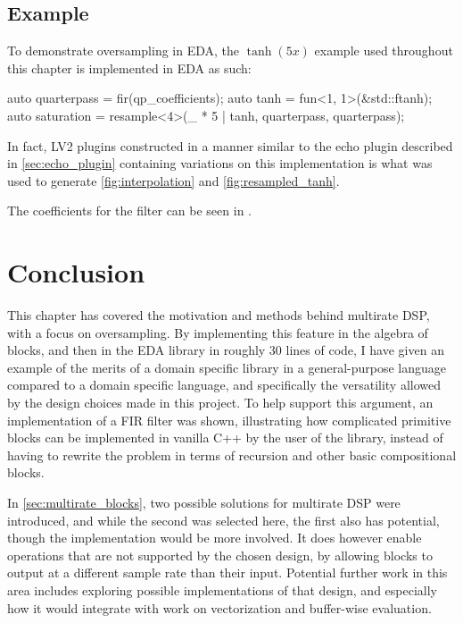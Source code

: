 \subsection{Example}

To demonstrate oversampling in EDA, the $\tanh(5x)$ example used throughout this chapter is
implemented in EDA as such:

\begin{cppcodenl}
  auto quarterpass = fir(qp_coefficients);
  auto tanh = fun<1, 1>(&std::ftanh);
  auto saturation = resample<4>(_ * 5 | tanh, quarterpass, quarterpass);
\end{cppcodenl}

In fact, LV2 plugins constructed in a manner similar to the echo plugin described in \autoref{sec:echo_plugin}
containing variations on this implementation is what was used to generate \autoref{fig:interpolation} and
\autoref{fig:resampled_tanh}.

The coefficients for the filter can be seen in .

\section{Conclusion}

This chapter has covered the motivation and methods behind multirate DSP, with a focus on oversampling. By
implementing this feature in the algebra of blocks, and then in the EDA library in roughly 30 lines of code,
I have given an example of the merits of a domain specific library in a general-purpose language compared to
a domain specific language, and specifically the versatility allowed by the design choices made in this
project. To help support this argument, an implementation of a FIR filter was shown, illustrating how
complicated primitive blocks can be implemented in vanilla C++ by the user of the library, instead of having
to rewrite the problem in terms of recursion and other basic compositional blocks.

In \autoref{sec:multirate_blocks}, two possible solutions for multirate DSP were introduced, and while the second
was selected here, the first also has potential, though the implementation would be more involved. It does
however enable operations that are not supported by the chosen design, by allowing blocks to output at a
different sample rate than their input. Potential further work in this area includes exploring possible
implementations of that design, and especially how it would integrate with work on vectorization and
buffer-wise evaluation.
